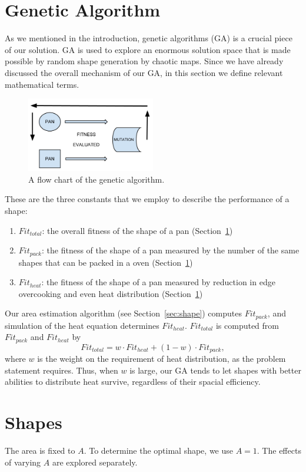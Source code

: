 \documentclass[12pt]{reedmcm}
\begin{document}
\section{Genetic Algorithm}
\label{sec:ga}
As we mentioned in the introduction, genetic algorithms (GA) is a crucial piece of our solution.
GA is used to explore an enormous solution space that is made possible by random shape generation by chaotic maps.
Since we have already discussed the overall mechanism of our GA, in this section we define relevant mathematical terms.
%
\begin{figure}[t]
  \centering
  \includegraphics[width=0.5\textwidth]{ga_flowchart}
  \caption{A flow chart of the genetic algorithm.}
  \label{fig:gaflow}
\end{figure}
%
These are the three constants that we employ to describe the performance of a shape:
\begin{enumerate}
  \item $Fit_{total}$: the overall fitness of the shape of a pan (Section~\ref{sec:ga})
  \item $Fit_{pack}$: the fitness of the shape of a pan measured by the number of the same shapes that can be packed in a oven (Section~\ref{sec:ga})
  \item $Fit_{heat}$:  the fitness of the shape of a pan measured by reduction in edge overcooking and even heat distribution (Section~\ref{sec:ga})
\end{enumerate}
Our area estimation algorithm (see Section~\ref{sec:shape}) computes $Fit_{pack}$, and simulation of the heat equation determines $Fit_{heat}$.
$Fit_{total}$ is computed from $Fit_{pack}$ and $Fit_{heat}$ by
\begin{equation*}
  Fit_{total} = w \cdot Fit_{heat} + (1-w) \cdot Fit_{pack},
\end{equation*}
where $w$ is the weight on the requirement of heat distribution, as the problem statement requires.
Thus, when $w$ is large, our GA tends to let shapes with better abilities to distribute heat survive, regardless of their spacial efficiency.

\section{Shapes}
\label{sec:shapes}
The area is fixed to $A$. To determine the optimal shape, we use $A=1$. The effects of varying $A$ are explored separately.
\end{document}
